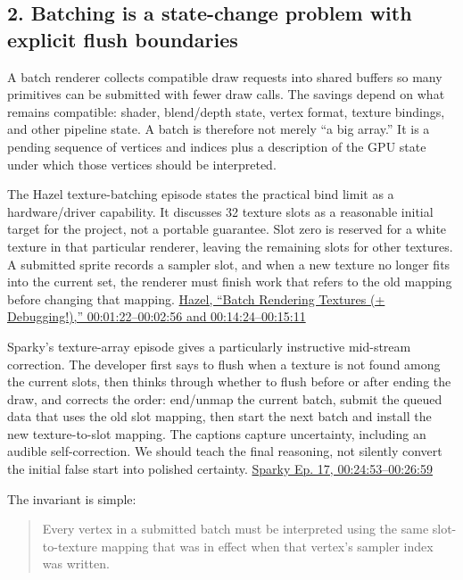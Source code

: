 \subsection{2. Batching is a state-change problem with explicit flush boundaries}\label{06-engine-ii-ch041-batching-is-a-state-change-problem-with-explicit-flush-boundaries}

\hypertarget{06-engine-ii-ch041-batching-is-a-state-change-problem-with-explicit-flush-boundaries}{}

A batch renderer collects compatible draw requests into shared buffers so many primitives can be submitted with fewer draw calls. The savings depend on what remains compatible: shader, blend/depth state, vertex format, texture bindings, and other pipeline state. A batch is therefore not merely ``a big array.'' It is a pending sequence of vertices and indices plus a description of the GPU state under which those vertices should be interpreted.

The Hazel texture-batching episode states the practical bind limit as a hardware/driver capability. It discusses 32 texture slots as a reasonable initial target for the project, not a portable guarantee. Slot zero is reserved for a white texture in that particular renderer, leaving the remaining slots for other textures. A submitted sprite records a sampler slot, and when a new texture no longer fits into the current set, the renderer must finish work that refers to the old mapping before changing that mapping. \href{https://www.youtube.com/watch?v=Fz1VySWaad8&t=1m22s}{Hazel, ``Batch Rendering Textures (+ Debugging!),'' 00:01:22--00:02:56 and 00:14:24--00:15:11}

Sparky's texture-array episode gives a particularly instructive mid-stream correction. The developer first says to flush when a texture is not found among the current slots, then thinks through whether to flush before or after ending the draw, and corrects the order: end/unmap the current batch, submit the queued data that uses the old slot mapping, then start the next batch and install the new texture-to-slot mapping. The captions capture uncertainty, including an audible self-correction. We should teach the final reasoning, not silently convert the initial false start into polished certainty. \href{https://www.youtube.com/watch?v=1x4hrdS97cI&t=24m53s}{Sparky Ep. 17, 00:24:53--00:26:59}

The invariant is simple:

\begin{quote}
Every vertex in a submitted batch must be interpreted using the same slot-to-texture mapping that was in effect when that vertex's sampler index was written.
\end{quote}

